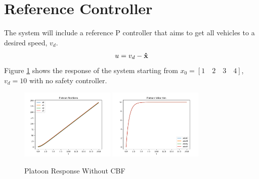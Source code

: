 \section{Reference Controller}
\noindent The system will include a reference P controller that aims to get all vehicles to a desired speed, $v_d$.
\begin{align} \label{eqn:platoon_reference}
    u = v_d - {\mathbf{\dot{x}}}
\end{align}
\noindent Figure \ref{fig:platoon_no_cbf} shows the response of the system starting from $x_0 = [1 \quad 2 \quad 3 \quad 4]$, $v_d = 10$ with no safety controller.

\begin{figure}[H]
    \centering
    \includegraphics[width=0.4\textwidth]{Figures/Examples/Platoon/NoPositions.png}
    \includegraphics[width=0.4\textwidth]{Figures/Examples/Platoon/NoVelocities.png}
    \caption{Platoon Response Without CBF}
    \label{fig:platoon_no_cbf}
\end{figure}

